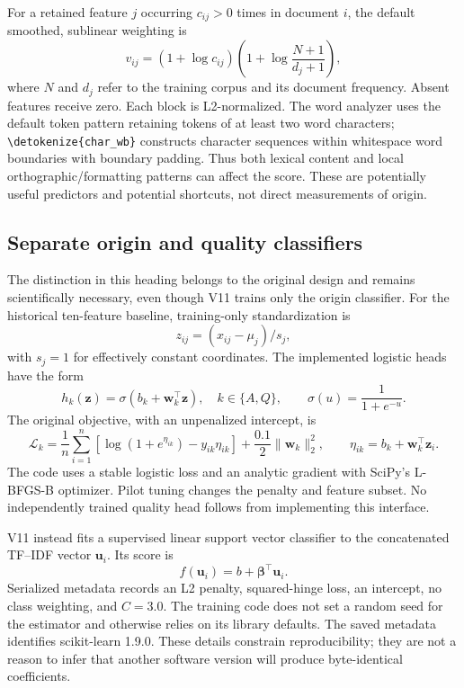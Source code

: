 \documentclass[11pt]{article}
\newcommand{\code}[1]{\expandafter\nolinkurl\expandafter{\detokenize{#1}}}
\begin{document}
For a retained feature $j$ occurring $c_{ij}>0$ times in document $i$, the
default smoothed, sublinear weighting is
\begin{equation}
v_{ij}=(1+\log c_{ij})\left(1+\log\frac{N+1}{d_j+1}\right),
\label{eq:tfidf}
\end{equation}
where $N$ and $d_j$ refer to the training corpus and its document frequency.
Absent features receive zero. Each block is L2-normalized. The word analyzer
uses the default token pattern retaining tokens of at least two word
characters; \code{char_wb} constructs character sequences within whitespace
word boundaries with boundary padding. Thus both lexical content and local
orthographic/formatting patterns can affect the score. These are potentially
useful predictors and potential shortcuts, not direct measurements of origin.

\subsection{Separate origin and quality classifiers}
The distinction in this heading belongs to the original design and remains
scientifically necessary, even though V11 trains only the origin classifier.
For the historical ten-feature baseline, training-only standardization is
\begin{equation}
z_{ij}=(x_{ij}-\mu_j)/s_j,
\end{equation}
with $s_j=1$ for effectively constant coordinates. The implemented logistic
heads have the form
\begin{equation}
h_k(\mathbf z)=\sigma(b_k+\mathbf w_k^\top\mathbf z),
\quad k\in\{A,Q\},\qquad \sigma(u)=\frac{1}{1+e^{-u}}.
\end{equation}
The original objective, with an unpenalized intercept, is
\begin{equation}
\mathcal L_k=\frac1n\sum_{i=1}^{n}
\left[\log(1+e^{\eta_{ik}})-y_{ik}\eta_{ik}\right]
+\frac{0.1}{2}\lVert\mathbf w_k\rVert_2^2,
\qquad \eta_{ik}=b_k+\mathbf w_k^\top\mathbf z_i.
\end{equation}
The code uses a stable logistic loss and an analytic gradient with SciPy's
L-BFGS-B optimizer. Pilot tuning changes the penalty and feature subset.
No independently trained quality head follows from implementing this interface.

V11 instead fits a supervised linear support vector classifier to the
concatenated TF--IDF vector $\mathbf u_i$. Its score is
\begin{equation}
f(\mathbf u_i)=b+\boldsymbol\beta^\top\mathbf u_i.
\label{eq:svm}
\end{equation}
Serialized metadata records an L2 penalty, squared-hinge loss, an intercept,
no class weighting, and $C=3.0$. The training code does not set a random seed
for the estimator and otherwise relies on its library defaults. The saved
metadata identifies scikit-learn 1.9.0. These details constrain reproducibility;
they are not a reason to infer that another software version will produce
byte-identical coefficients.
\end{document}
